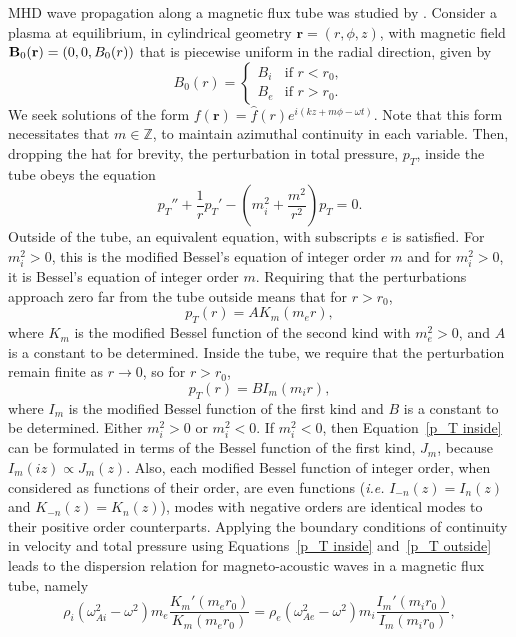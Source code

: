 MHD wave propagation along a magnetic flux tube was studied by \cite{edw_etal83}. Consider a plasma at equilibrium, in cylindrical geometry $\mathbf{r} = (r, \phi, z)$, with magnetic field $\mathbf{B}_0(\mathbf{r}) = (0, 0, B_0(r))$ that is piecewise uniform in the radial direction, given by
\begin{equation}
B_0(r) =
\begin{cases}
B_i & \text{if } r < r_0, \\
B_e & \text{if } r > r_0.
\end{cases}
\end{equation}
We seek solutions of the form $f(\mathbf{r}) = \hat{f}(r)e^{i(kz + m\phi - \omega t)}$. Note that this form necessitates that $m \in \mathbb{Z}$, to maintain azimuthal continuity in each variable. Then, dropping the hat for brevity, the perturbation in total pressure, $p_T$, inside the tube obeys the equation
\begin{equation}
	p_T'' + \frac{1}{r}p_T' - (m_i^2 + \frac{m^2}{r^2})p_T = 0.
\end{equation}
Outside of the tube, an equivalent equation, with subscripts $e$ is satisfied. For $m_i^2 > 0$, this is the modified Bessel's equation of integer order $m$ and for $m_i^2 > 0$, it is Bessel's equation of integer order $m$. Requiring that the perturbations approach zero far from the tube outside means that for $r > r_0$,
\begin{equation}
	p_T(r) = A K_m(m_e r), \label{p_T outside}
\end{equation}
where $K_m$ is the modified Bessel function of the second kind with $m_e^2 > 0$, and $A$ is a constant to be determined. Inside the tube, we require that the perturbation remain finite as $r \to 0$, so for $r > r_0$,
\begin{equation}
	p_T(r) = B I_m(m_i r), \label{p_T inside}
\end{equation}
where $I_m$ is the modified Bessel function of the first kind and $B$ is a constant to be determined. Either $m_i^2 > 0$ or $m_i^2 < 0$. If $m_i^2 < 0$, then Equation~\eqref{p_T inside} can be formulated in terms of the Bessel function of the first kind, $J_m$, because $I_m(iz) \propto J_m(z)$. Also, each modified Bessel function of integer order, when considered as functions of their order, are even functions (\textit{i.e.} $I_{-n} (z) = I_n(z)$ and $K_{-n} (z) = K_n(z)$), modes with negative orders are identical modes to their positive order counterparts. Applying the boundary conditions of continuity in velocity and total pressure using Equations~\eqref{p_T inside} and~\eqref{p_T outside} leads to the dispersion relation for magneto-acoustic waves in a magnetic flux tube, namely
\begin{equation}
\rho_i(\omega_{Ai}^2 - \omega^2)m_e\frac{K_m'(m_er_0)}{K_m(m_er_0)} = \rho_e(\omega_{Ae}^2 - \omega^2)m_i\frac{I_m'(m_ir_0)}{I_m(m_ir_0)},
\end{equation}

